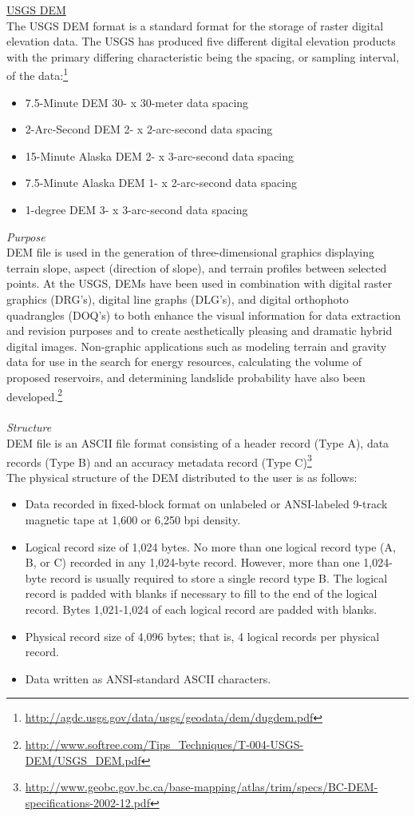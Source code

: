 \documentclass[11pt]{article}
\begin{document}
\underline{USGS DEM}\\
The USGS DEM format is a standard format for the storage of raster digital elevation data. The USGS has produced five different digital elevation products  with the primary differing characteristic being the spacing, or sampling interval, of the data:\footnote{\url{http://agdc.usgs.gov/data/usgs/geodata/dem/dugdem.pdf}}
\begin{itemize}
\item 7.5-Minute DEM 30- x 30-meter data spacing
\item 2-Arc-Second DEM 2- x 2-arc-second data spacing
\item 15-Minute Alaska DEM 2- x 3-arc-second data spacing
\item 7.5-Minute Alaska DEM 1- x 2-arc-second data spacing
\item 1-degree DEM 3- x 3-arc-second data spacing
\end{itemize}

\noindent\textit{Purpose} 
\\ DEM file is used in the generation of three-dimensional graphics displaying terrain slope, aspect (direction of slope), and terrain profiles between selected points. At the USGS, DEMs have been used in combination with digital raster graphics (DRG's), digital line graphs (DLG's), and digital orthophoto quadrangles (DOQ's) to both enhance the visual information for data extraction and revision purposes and to create aesthetically pleasing and dramatic hybrid digital images. Non-graphic applications such as modeling terrain and gravity data for use in the search for energy resources, calculating the volume of proposed reservoirs, and determining landslide probability have also been developed.\footnote{\url{http://www.softree.com/Tips_Techniques/T-004-USGS-DEM/USGS_DEM.pdf}}
\\\\ \textit{Structure} 
\\ DEM file is an ASCII file format consisting of a header record (Type A), data records (Type B) and an accuracy metadata record (Type C)\footnote{\url{http://www.geobc.gov.bc.ca/base-mapping/atlas/trim/specs/BC-DEM-specifications-2002-12.pdf}}
\\ The physical structure of the DEM distributed to the user is as follows:\footnotemark[4]
\begin{itemize}
\item Data recorded in fixed-block format on unlabeled or ANSI-labeled 9-track magnetic tape at 1,600 or 6,250 bpi density. 
\item Logical record size of 1,024 bytes. No more than one logical record type (A, B, or C) recorded in any 1,024-byte record. However, more than one 1,024-byte record is usually required to store a single record type B. The logical record is padded with blanks if necessary to fill to the end of the 
logical record. Bytes 1,021-1,024 of each logical record are padded with blanks. 
\item Physical record size of 4,096 bytes; that is, 4 logical records per physical record. 
\item Data written as ANSI-standard ASCII characters.
\end{itemize}
\end{document}
